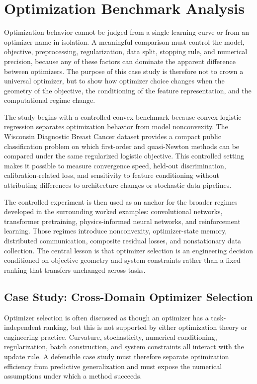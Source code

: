 \section{Optimization Benchmark Analysis}

Optimization behavior cannot be judged from a single learning curve or from an optimizer name in isolation. A meaningful comparison must control the model, objective, preprocessing, regularization, data split, stopping rule, and numerical precision, because any of these factors can dominate the apparent difference between optimizers. The purpose of this case study is therefore not to crown a universal optimizer, but to show how optimizer choice changes when the geometry of the objective, the conditioning of the feature representation, and the computational regime change.

The study begins with a controlled convex benchmark because convex logistic regression separates optimization behavior from model nonconvexity. The Wisconsin Diagnostic Breast Cancer dataset provides a compact public classification problem on which first-order and quasi-Newton methods can be compared under the same regularized logistic objective. This controlled setting makes it possible to measure convergence speed, held-out discrimination, calibration-related loss, and sensitivity to feature conditioning without attributing differences to architecture changes or stochastic data pipelines.

The controlled experiment is then used as an anchor for the broader regimes developed in the surrounding worked examples: convolutional networks, transformer pretraining, physics-informed neural networks, and reinforcement learning. Those regimes introduce nonconvexity, optimizer-state memory, distributed communication, composite residual losses, and nonstationary data collection. The central lesson is that optimizer selection is an engineering decision conditioned on objective geometry and system constraints rather than a fixed ranking that transfers unchanged across tasks.

\subsection{Case Study: Cross-Domain Optimizer Selection}

Optimizer selection is often discussed as though an optimizer has a task-independent ranking, but this is not supported by either optimization theory or engineering practice. Curvature, stochasticity, numerical conditioning, regularization, batch construction, and system constraints all interact with the update rule. A defensible case study must therefore separate optimization efficiency from predictive generalization and must expose the numerical assumptions under which a method succeeds.

